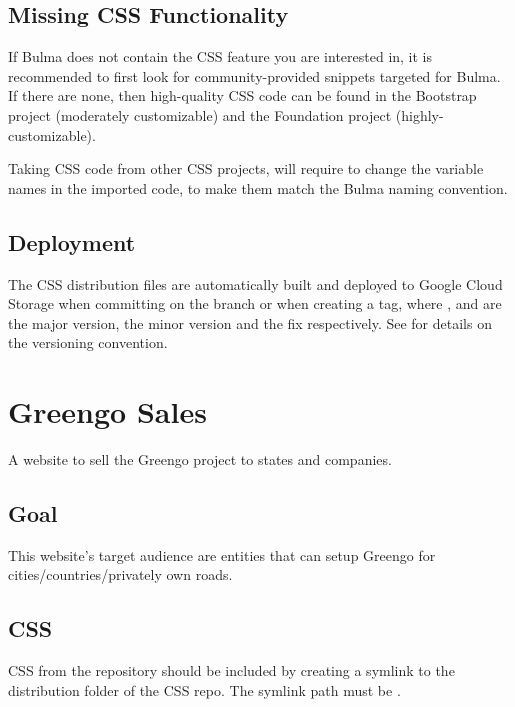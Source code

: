 \documentclass[letterpaper,10pt,english]{sphinxmanual}
\begin{document}
\subsection{Missing CSS Functionality}
\label{\detokenize{websites/css:missing-css-functionality}}
If Bulma does not contain the CSS feature you are interested in, it is recommended to first look for community-provided snippets targeted for Bulma.
If there are none, then high-quality CSS code can be found in the Bootstrap project (moderately customizable) and the Foundation project (highly-customizable).

Taking CSS code from other CSS projects, will require to change the variable names in the imported code, to make them match the Bulma naming convention.


\subsection{Deployment}
\label{\detokenize{websites/css:deployment}}
The CSS distribution files are automatically built and deployed to Google Cloud Storage when committing on the  branch or when creating a  tag, where ,  and  are the major version, the minor version and the fix respectively.
See {\hyperref[\detokenize{software_engineering:semantic-versioning}]{}} for details on the versioning convention.


\section{Greengo Sales}
\label{\detokenize{websites/greengo_sales:greengo-sales}}\label{\detokenize{websites/greengo_sales::doc}}
A website to sell the Greengo project to states and companies.


\subsection{Goal}
\label{\detokenize{websites/greengo_sales:goal}}
This website’s target audience are entities that can setup Greengo for cities/countries/privately own roads.


\subsection{CSS}
\label{\detokenize{websites/greengo_sales:css}}
CSS from the  repository should be included by creating a symlink to the distribution folder of the CSS repo.
The symlink path must be .
\end{document}
